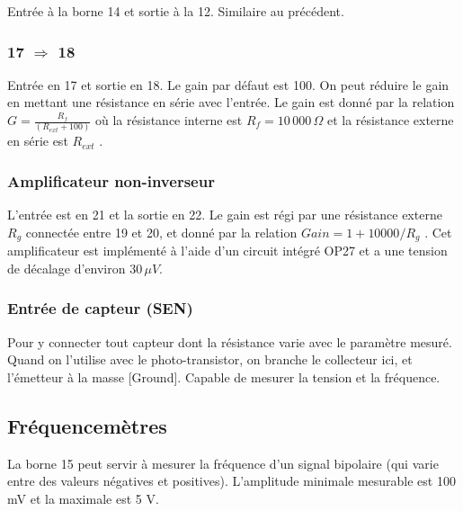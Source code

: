 \documentclass{book}
\begin{document}
Entrée à la borne 14 et sortie à la 12. Similaire au précédent.




\subsubsection{17 $\Rightarrow$ 18}





Entrée en 17 et sortie en 18. Le gain par défaut est 100. On peut réduire le gain en mettant une résistance en série avec l'entrée. Le gain est donné par la relation $G=\frac{R_{f}}{(R_{ext}+100)}$  où la résistance interne est $R_{f}=10\,000\,\Omega$  et la résistance externe en série est $R_{ext}$ .




\subsubsection{Amplificateur non-inverseur}





L'entrée est en 21 et la sortie en 22. Le gain est régi par une résistance externe $R_{g}$  connectée entre 19 et 20, et donné par la relation $Gain=1+10000/R_{g}$ . Cet amplificateur est implémenté à l'aide d'un circuit intégré OP27 et a une tension de décalage d'environ $30\,\mu V$.







\subsubsection{Entrée de capteur (SEN)}





Pour y connecter tout capteur dont la résistance varie avec le paramètre mesuré. Quand on l'utilise avec le photo-transistor, on branche le collecteur ici, et l'émetteur à la masse [Ground]. Capable de mesurer la tension et la fréquence.




\subsection{Fréquencemètres}





La borne 15 peut servir à mesurer la fréquence d'un signal bipolaire (qui varie entre des valeurs négatives et positives). L'amplitude minimale mesurable est 100 mV et la maximale est 5 V.
\end{document}
